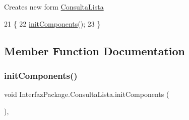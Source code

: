 Creates new form \mbox{\hyperlink{class_interfaz_package_1_1_consulta_lista}{Consulta\+Lista}} 
\begin{DoxyCode}
21                            \{
22         \mbox{\hyperlink{class_interfaz_package_1_1_consulta_lista_aae3ab18bcc107fb71521a4c09591c108}{initComponents}}();
23     \}
\end{DoxyCode}


\subsection{Member Function Documentation}
\mbox{\label{class_interfaz_package_1_1_consulta_lista_aae3ab18bcc107fb71521a4c09591c108}} 
\subsubsection{\texorpdfstring{init\+Components()}{initComponents()}}
{\footnotesize\ttfamily void Interfaz\+Package.\+Consulta\+Lista.\+init\+Components (\begin{DoxyParamCaption}{ }\end{DoxyParamCaption})\hspace{0.3cm}{\ttfamily [inline]}, {\ttfamily [private]}}

